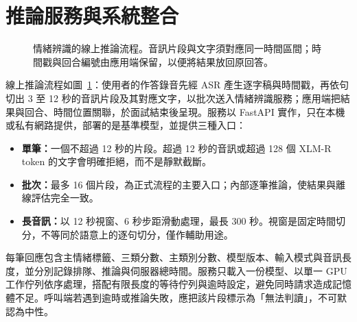 \section{推論服務與系統整合}
\label{sec:inference}

\begin{figure}[!htb]
\centering
{}
\caption{情緒辨識的線上推論流程。音訊片段與文字須對應同一時間區間；時間戳與回合編號由應用端保留，以便將結果放回原回答。}
\label{fig:inference}
\end{figure}

線上推論流程如圖~\ref{fig:inference}：使用者的作答錄音先經 ASR 產生逐字稿與時間戳，再依句切出 3 至 12 秒的音訊片段及其對應文字，以批次送入情緒辨識服務；應用端把結果與回合、時間位置關聯，於面試結束後呈現。服務以 FastAPI 實作，只在本機或私有網路提供，部署的是基準模型，並提供三種入口：

\begin{itemize}
  \item \textbf{單筆：}一個不超過 12 秒的片段。超過 12 秒的音訊或超過 128 個 XLM-R token 的文字會明確拒絕，而不是靜默截斷。
  \item \textbf{批次：}最多 16 個片段，為正式流程的主要入口；內部逐筆推論，使結果與離線評估完全一致。
  \item \textbf{長音訊：}以 12 秒視窗、6 秒步距滑動處理，最長 300 秒。視窗是固定時間切分，不等同於語意上的逐句切分，僅作輔助用途。
\end{itemize}

每筆回應包含主情緒標籤、三類分數、主類別分數、模型版本、輸入模式與音訊長度，並分別記錄排隊、推論與伺服器總時間。服務只載入一份模型、以單一 GPU 工作佇列依序處理，搭配有限長度的等待佇列與逾時設定，避免同時請求造成記憶體不足。呼叫端若遇到逾時或推論失敗，應把該片段標示為「無法判讀」，不可默認為中性。

